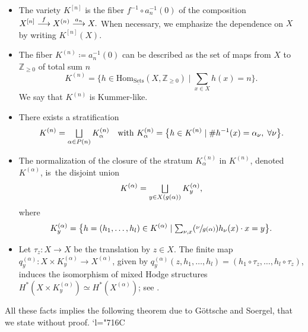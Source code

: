 \documentclass[JEP,XML,SOM,Unicode, NoEqCountersInSection,NoFloatCountersInSection,published]{cedram}
\let\ts\textstyle
\newcommand{\Psfrac}[2]{(\sfrac{#1}{#2})}
\newcommand{\To}[1]{\mathchoice{\xrightarrow{\textstyle\kern4pt#1\kern3pt}}{\stackrel{#1}{\longrightarrow}}{}{}}
\let\oldbigsqcup\bigsqcup
\renewcommand{\bigsqcup}{\mathop{\textstyle\oldbigsqcup}\displaylimits}
\newcommand{\Changelback}{\mathcode`l="716C}
\theoremstyle{definition}
\newcommand{\ZZ}{\mathbb{Z}}
\begin{document}
\begin{itemize}
\item The variety $K^{[n]}$ is the fiber $f^{-1} \circ a^{-1}_n(0)$ of the composition
$
X^{[n]} \To{f} X^{(n)} \To{a_n} X.
$
When necessary, we emphasize the dependence on $X$ by writing $K^{[n]}(X)$.
\item The fiber $K^{(n)} \coloneqq a_n^{-1}(0)$ can be described as the set of maps from $X$ to $\ZZ_{\geq 0}$ of total sum $n$
\[
K^{(n)} = \big\{ h \in \mathrm{Hom}_{\underline{\mathrm{Sets}}}(X, \ZZ_{\geq 0}) \mid\ts\sum_{x \in X} h(x)=n \big\}.
\]
We say that $K^{(n)}$ is Kummer-like.
\item There exists a stratification
\[
K^{(n)} = \bigsqcup_{\alpha \in P(n)} K^{(n)}_{\alpha}\quad \text{with }
K^{(n)}_{\alpha} = \big\{ h \in K^{(n)} \mid  \# h^{-1}(x)= \alpha_{\nu},\; \forall \nu \big\}.
\]
\item The normalization of the closure of the stratum $K^{(n)}_{\alpha}$ in $K^{(n)}$, denoted $K^{(\alpha)}$, is~the disjoint union
\[
K^{(\alpha)}= \bigsqcup_{y \in X(g(\alpha))} K^{(\alpha)}_y,
\]
where
\[
K^{(\alpha)}_y = \big\{ h =(h_1, \ldots, h_l) \in K^{(\alpha)} \mid  \ts\sum_{\nu, x} \Psfrac{\nu}{g(\alpha)}h_{\nu}(x) \cdot x=y\big\}.
\]
\item Let $\tau_{z}\colon X \to X$ be the translation by $z \in X$. The finite map $q^{(\alpha)}_y\colon X \times K^{(\alpha)}_y \to X^{(\alpha)}$, given by $q^{(\alpha)}_y(z, h_1,\ldots, h_l)=(h_1 \circ \tau_z, \ldots, h_l \circ \tau_z)$, induces the isomorphism of mixed Hodge structures $H^*(X \times K^{(\alpha)}_y) \simeq H^*(X^{(\alpha)})$; see \cite[p.\,243]{GottscheSoergel93}.
\end{itemize}
All these facts implies the following theorem due to Göttsche and Soergel, that we state without proof.
\Changelback
\end{document}
